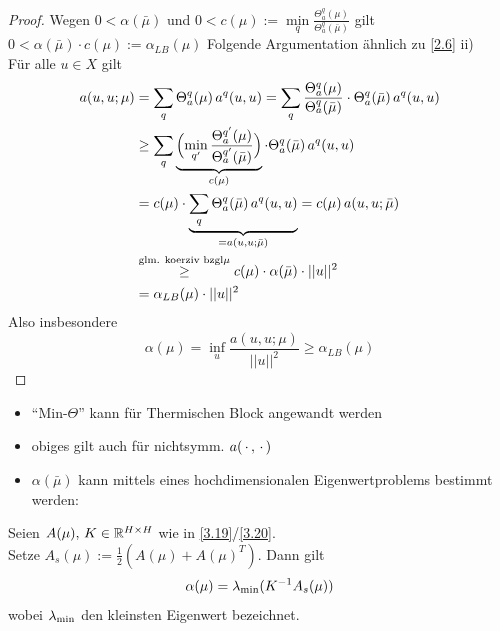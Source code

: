 \begin{proof}
	Wegen $0 < \alpha(\bar{\mu})$ und $0 < c(\mu) := \min\limits_q \frac{\Theta_a^q(\mu)}{\Theta_a^q(\bar{\mu})}$ gilt $ 0 < \alpha(\bar{\mu}) \cdot c(\mu) := \alpha_{LB}(\mu)$
	Folgende Argumentation ähnlich zu \ref{2.6} ii) \\
	Für alle $u \in X$ gilt
	\begin{align*}
		a(u,u;\mu) &= \sum\limits_q \Theta_a^q(\mu) \, a^q(u,u) = \sum\limits_q \frac{\Theta_a^q(\mu)}{\Theta_a^q(\bar{\mu})} \cdot \Theta_a^q(\bar{\mu}) \, a^q(u,u) \\
		&\geq \sum\limits_q \underbrace{\Bigl( \min\limits_{q'} \frac{\Theta_a^{q'}(\mu)}{\Theta_a^{q'}(\bar{\mu})} \Bigr)}_{c(\mu)} \cdot \Theta_a^q(\bar{\mu}) \, a^q(u,u) \\
		&= c(\mu) \cdot \underbrace{\sum\limits_q \Theta_a^q(\bar{\mu}) \, a^q(u,u)}_{= a(u,u;\bar{\mu})} = c(\mu) \, a(u,u;\bar{\mu}) \\
		&\overset{\text{glm. koerziv bzgl} \mu}{\geq} c(\mu) \cdot \alpha(\bar{\mu}) \cdot ||u||^2 \\
		&= \alpha_{LB}(\mu) \cdot ||u||^2
	\end{align*}
	Also insbesondere
	\[
		\alpha(\mu) = \inf\limits_u \frac{a(u,u;\mu)}{||u||^2} \geq \alpha_{LB}(\mu)
	\]
\end{proof}

\begin{bem} \beginwithlistbem
	\begin{itemize}
		\item ``Min-$\Theta$'' kann für Thermischen Block angewandt werden
		\item obiges gilt auch für nichtsymm. $a(\,\cdot\, , \,\cdot\,)$
		\item $\alpha(\bar{\mu})$ kann mittels eines hochdimensionalen Eigenwertproblems bestimmt werden:
	\end{itemize}
\end{bem}

\begin{satz}
	Seien $A(\mu), \, K \in \mathbb{R}^{H \times H}$ wie in \ref{3.19}/\ref{3.20}. \\
	Setze $A_s(\mu) := \frac{1}{2} (A(\mu) + A(\mu)^T)$. Dann gilt
	\[
		\alpha(\mu) = \lambda_{\operatorname{min}} (K^{-1} A_s(\mu))
	\]
	wobei $\lambda_{\operatorname{min}}$ den kleinsten Eigenwert bezeichnet.
\end{satz}

